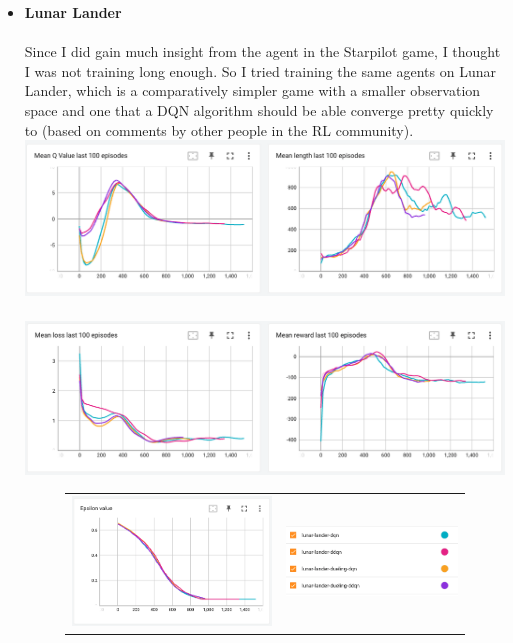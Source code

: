 \documentclass[paper=a4, fontsize=11pt, margin=1in]{scrartcl}
\numberwithin{equation}{section}		%
\numberwithin{figure}{section}			%
\numberwithin{table}{section}				%
\begin{document}
\begin{itemize}
    \item \textbf{Lunar Lander}\\\\
    Since I did gain much insight from the agent in the Starpilot game, I thought I was not training long enough. So I tried training the same agents on Lunar Lander, which is a comparatively simpler game with a smaller observation space and one that a DQN algorithm should be able converge pretty quickly to (based on comments by other people in the RL community).\\

    
    \includegraphics[scale=0.4]{lunar1.png}\\\\
    \includegraphics[scale=0.4]{lunar2.png}
    \begin{figure}[h]
    \begin{tabular}{ll}
    \hspace*{8mm}\includegraphics[width=0.5\linewidth]{lunar3.png}
    &
    \includegraphics[scale=0.4]{lunar4.png}

\end{tabular}
\end{figure}
\end{itemize}
\end{document}
